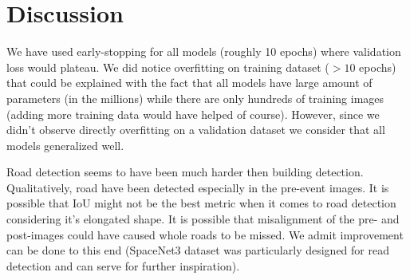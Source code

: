 \documentclass[10pt,twocolumn,letterpaper]{article}
\begin{document}
\section{Discussion}
\label{sec:discussion}




We have used early-stopping for all models (roughly 10 epochs) where validation loss would plateau. We did notice overfitting on training dataset ($>10$ epochs) that could be explained with the fact that all models have large amount of parameters (in the millions) while there are only hundreds of training images (adding more training data would have helped of course). However, since we didn't observe directly overfitting on a validation dataset we consider that all models generalized well.

Road detection seems to have been much harder then building detection. Qualitatively, road have been detected especially in the pre-event images. It is possible that IoU might not be the best metric when it comes to road detection considering it's elongated shape. It is possible that misalignment of the pre- and post-images could have caused whole roads to be missed. We admit improvement can be done to this end (SpaceNet3 dataset was particularly designed for read detection and can serve for further inspiration).

\end{document}
